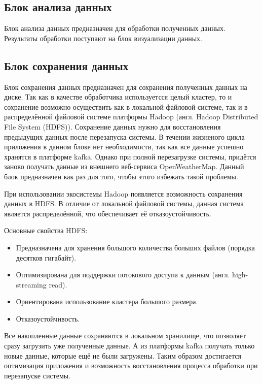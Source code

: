 \subsection{Блок анализа данных}

Блок анализа данных предназначен для обработки полученных данных.
Результаты обработки поступают на блок визуализации данных.

\subsection{Блок сохранения данных}

Блок сохранения данных предназначен для сохранения полученных данных на диске.
Так как в качестве обработчика используетсся целый кластер, то и сохранение возможно осуществить как в локальной файловой системе, так и в распределённой файловой системе платформы Hadoop (англ. Hadoop Distributed File System (HDFS)).
Сохранение данных нужно для восстановления предыдущих данных после перезапуска системы.
В течении жизненого цикла приложения в данном блоке нет необходимости, так как все данные успешно хранятся в платформе kafka.
Однако при полной перезагрузке системы, придётся заново получать данные из внешнего веб-сервиса OpenWeatherMap. 
Данный блок предназначен как раз для того, чтобы этого избежать такой проблемы.

При использовании экосистемы Hadoop появляется возможность сохранения данных в HDFS.
В отличие от локальной файловой системы, данная система является распределённой, что обеспечивает её отказоустойчивость.

Основные свойства HDFS:
\begin{itemize}
    \item Предназначена для хранения большого количества больших файлов (порядка десятков гигабайт).
    \item Оптимизирована для поддержки потокового доступа к данным (англ. high-streaming read).
    \item Ориентирована использование кластера большого размера.
    \item Отказоустойчивость.
\end{itemize}

Все накопленные данные сохраняются в локальном хранилище, что позволяет сразу загрузить уже полученные данные.
А из платформы kafka получать только новые данные, которые ещё не были загружены.
Таким образом достигается оптимизация приложения и возможность восстановления процесса обработки при перезапуске системы.


